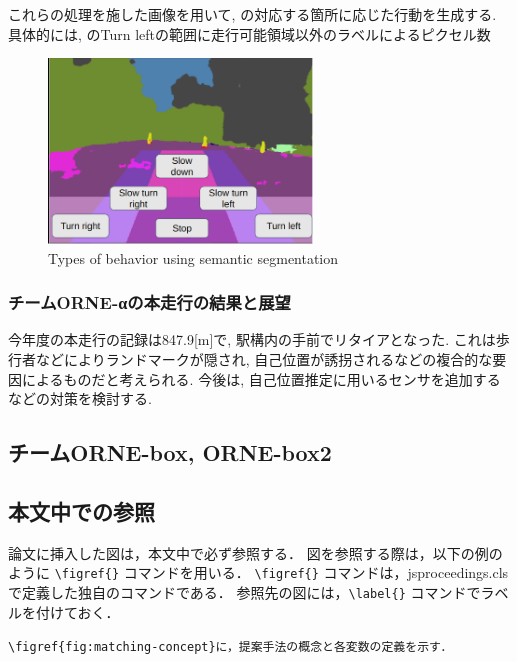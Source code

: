 \documentclass[uplatex, twocolumn, 9pt]{jsproceedings}
\begin{document}
これらの処理を施した画像を用いて, の対応する箇所に応じた行動を生成する. 具体的には, のTurn leftの範囲に走行可能領域以外のラベルによるピクセル数

\begin{figure}[h]
  \centering
  \includegraphics[width=70mm]{fig/seg.pdf}
  \caption{Types of behavior using semantic segmentation}
  \label{fig:seg}%
\end{figure}

\subsubsection{チームORNE-αの本走行の結果と展望}
今年度の本走行の記録は847.9[m]で, 駅構内の手前でリタイアとなった. これは歩行者などによりランドマークが隠され, 自己位置が誘拐されるなどの複合的な要因によるものだと考えられる. 今後は, 自己位置推定に用いるセンサを追加するなどの対策を検討する. 

\subsection{チームORNE-box, ORNE-box2}


\subsection{本文中での参照}
論文に挿入した図は，本文中で必ず参照する．
図を参照する際は，以下の例のように \verb*|\figref{}| コマンドを用いる．
\verb*|\figref{}| コマンドは，jsproceedings.cls で定義した独自のコマンドである．
参照先の図には，\verb*|\label{}| コマンドでラベルを付けておく．
\begin{description}[style=nextline]
  \item[\LaTeX ソース]%
  \verb|\figref{fig:matching-concept}に，提案手法の概念と各変数の定義を示す．|
  \item[出力]%
\end{description}
\end{document}
